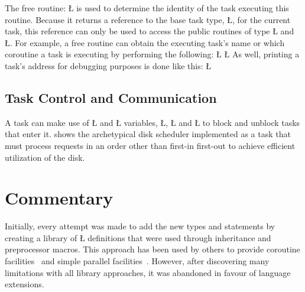 \documentclass[openright,twoside]{report}
\begin{document}
The free routine:
\LGinlinefalse\LGbegin\lgrinde
\L{}
\endlgrinde\LGend
{}%
is used to determine the identity of the task executing this routine.
Because it returns a reference to the base task type, \LGinlinetrue\LGbegin\lgrinde\L{}\endlgrinde\LGend{}, for the current task, this reference can only be used to access the public routines of type \LGinlinetrue\LGbegin\lgrinde\L{}\endlgrinde\LGend{} and \LGinlinetrue\LGbegin\lgrinde\L{}\endlgrinde\LGend{}.
For example, a free routine can obtain the executing task's name or which coroutine a task is executing by performing the following:
\LGinlinefalse\LGbegin\lgrinde
\L{}
\L{}
\endlgrinde\LGend
As well, printing a task's address for debugging purposes is done like this:
\LGinlinefalse\LGbegin\lgrinde
\L{}
\CE{}\endlgrinde\LGend


\subsection{Task Control and Communication}

A task can make use of \LGinlinetrue\LGbegin\lgrinde\L{}\endlgrinde\LGend{} and \LGinlinetrue\LGbegin\lgrinde\L{}\endlgrinde\LGend{} variables, \LGinlinetrue\LGbegin\lgrinde\L{}\endlgrinde\LGend{}, \LGinlinetrue\LGbegin\lgrinde\L{}\endlgrinde\LGend{} and \LGinlinetrue\LGbegin\lgrinde\L{}\endlgrinde\LGend{} to block and unblock tasks that enter it.
 shows the archetypical disk scheduler implemented as a task that must process requests in an order other than first-in first-out to achieve efficient utilization of the disk.


\section{Commentary}
\label{s:LibraryApproach}

Initially, every attempt was made to add the new \uC types and statements by creating a library of \LGinlinetrue\LGbegin\lgrinde\L{}\endlgrinde\LGend{} definitions that were used through inheritance and preprocessor macros.
This approach has been used by others to provide coroutine facilities~\cite{Shopiro87,Labreche90} and simple parallel facilities~\cite{Doeppner87,PRESTO}.
However, after discovering many limitations with all library approaches, it was abandoned in favour of language extensions.
\end{document}
